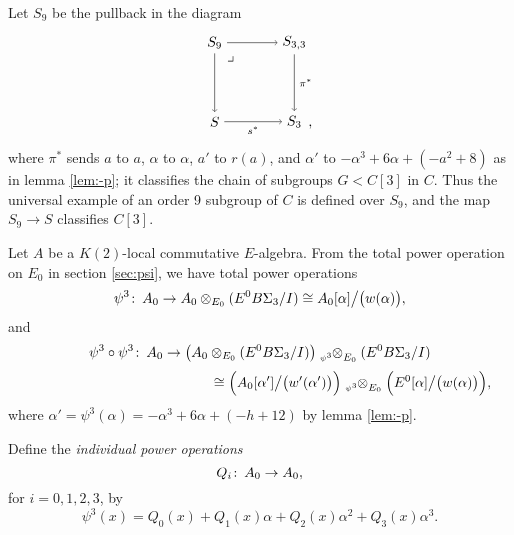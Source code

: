 \documentclass{gtpart}
\theoremstyle{definition}
\theoremstyle{remark}
\def\co{\colon\thinspace}
\newcommand{\A}{\alpha}
\newcommand{\p}{\psi^3}
\begin{document}
Let $S_9$ be the pullback in the diagram 
\begin{equation}
\label{S9}
 \begin{tikzpicture}[baseline=(current bounding box.center)]
         \node (LT) at (0, 2) {$S_9$}; 
         \node (RT) at (2, 2) {$S_{3,3}$}; 
         \node (LB) at (0, 0) {$S$}; 
         \node (RB) at (2, 0) {$S_3$}; 
         \node at (2.4, -0.125) {,}; 
         \node at (0.4, 1.6) {$\lrcorner$}; 
         \draw [->] (LT) --  (RT); 
         \draw [->] (LT) --  (LB); 
         \draw [->] (RT) -- node [right] {$\scriptstyle \pi^*$} (RB); 
         \draw [->] (LB) -- node [below] {$\scriptstyle s^*$} (RB); 
 \end{tikzpicture}
\end{equation}
where $\pi^*$ sends $a$ to $a$, $\A$ to $\A$, $a'$ to $r(a)$, and $\A'$ to $-\A^3 + 6 \A + (-a^2 + 8)$ as in lemma \ref{lem:-p}; 
it classifies the chain of subgroups $G < C[3]$ in $C$.  Thus the universal example of an order 9 subgroup of $C$ 
is defined over $S_9$, and the map $S_9 \to S$ classifies $C[3]$.  

Let $A$ be a $K(2)$-local commutative $E$-algebra.  
From the total power operation on $E_0$ in section \ref{sec:psi}, we have total power operations 
\[
 \p \co A_0 \to A_0 \otimes_{E_0} (E^0 B\Sigma_3 / I) \cong A_0 [\A] \big/ \big( w(\A) \big), 
\]
and 
\[
 \p \circ \p \co A_0 \to \big( A_0 \otimes_{E_0} (E^0 B\Sigma_3 / I) \big) \tensor[_{\scriptscriptstyle{\p}}]{\otimes}{_{E_0}} (E^0 B\Sigma_3 / I) 
\]
\[
 ~~~~~~~~~~~~~~~~~~~~~~~~~~~~~~~~~~~~~~~~\cong \Big( A_0 [\A'] \big/ \big( w'(\A') \big) \Big) \tensor[_{\scriptscriptstyle{\p}}]{\otimes}{_{E_0}} \Big( E^0 [\A] \big/ \big( w(\A) \big) \Big), 
\]
where $\A' = \p(\A) = -\A^3 + 6 \A + (-h + 12)$ by lemma \ref{lem:-p}.  

Define the {\em individual power operations} 
\[
 Q_i \co A_0 \to A_0, 
\]
for $i = 0, 1, 2, 3$, by 
\[
 \p (x) = Q_0(x) + Q_1(x) \A + Q_2(x) \A^2 + Q_3(x) \A^3.  
\]
\end{document}
